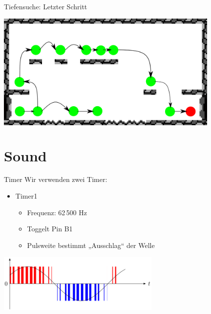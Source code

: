 \documentclass[fleqn]{beamer}
\begin{document}
    \begin{frame}{Tiefensuche: Letzter Schritt}
    		\begin{center}
    			\includegraphics[width=11cm]{Bilder/dfs7.png}
    		\end{center}
    \end{frame}    
    
    \section{Sound}
    \begin{frame}{Timer}
    Wir verwenden zwei Timer:
    \begin{itemize}
	    \item Timer1
	    		\begin{itemize}
	    			\item Frequenz: 62\,500 Hz
	    			\item Toggelt Pin B1
	    			\item Pulsweite bestimmt „Ausschlag“ der Welle
	    			
	    		\end{itemize}
    \end{itemize}
    \begin{center}
    		\includegraphics[width=8cm]{Bilder/pwm}
    \end{center}
    \end{frame}
    
\end{document}
